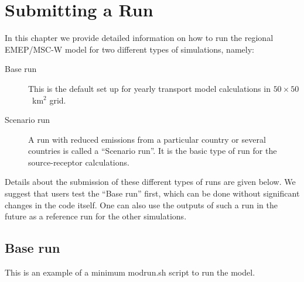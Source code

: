 \chapter{Submitting a Run}
\label{ch:SubmitARun}

In this chapter we provide detailed information on how to run the
regional EMEP/MSC-W model for two different types of
simulations, namely: 

\begin{description}

\item[Base run]
This is the default set up for yearly transport model calculations
in $50\times50$~km$^2$ grid. 
\item[Scenario run]
 A run with reduced emissions from a particular country or several
 countries is called 
a ``Scenario run''. It is the basic type of run for the source-receptor
calculations. 

\end{description}

\noindent
Details about the submission of these
different types of runs are given below. We suggest that users test
the ``Base run'' first, which can be done without significant changes in
the code itself. One can also use the outputs of such a run in the
future as a reference run for the other simulations.\\  
% 

\newpage
\section{Base run}

This is an example of a minimum modrun.sh script to run the model.

